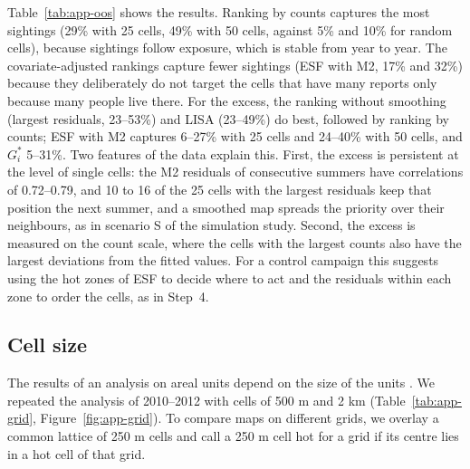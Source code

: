 Table~\ref{tab:app-oos} shows the results. Ranking by counts captures the most sightings (29\% with 25 cells, 49\% with 50 cells, against 5\% and 10\% for random cells), because sightings follow exposure, which is stable from year to year. The covariate-adjusted rankings capture fewer sightings (ESF with M2, 17\% and 32\%) because they deliberately do not target the cells that have many reports only because many people live there. For the excess, the ranking without smoothing (largest residuals, 23--53\%) and LISA (23--49\%) do best, followed by ranking by counts; ESF with M2 captures 6--27\% with 25 cells and 24--40\% with 50 cells, and $G_i^*$ 5--31\%. Two features of the data explain this. First, the excess is persistent at the level of single cells: the M2 residuals of consecutive summers have correlations of 0.72--0.79, and 10 to 16 of the 25 cells with the largest residuals keep that position the next summer, and a smoothed map spreads the priority over their neighbours, as in scenario S of the simulation study. Second, the excess is measured on the count scale, where the cells with the largest counts also have the largest deviations from the fitted values. For a control campaign this suggests using the hot zones of ESF to decide where to act and the residuals within each zone to order the cells, as in Step~4.

\begin{table}[ht]
\centering
\caption{Share of the next summer's sightings and of its excess over the M2 covariates captured by the first 25 and 50 cells of each priority list. Each column is a pair of training and test summers.}\label{tab:app-oos}
\resizebox{\textwidth}{!}{}
\end{table}

\subsection{Cell size}\label{sec:app-grid}



The results of an analysis on areal units depend on the size of the units \citep{openshaw1984modifiable}. We repeated the analysis of 2010--2012 with cells of 500 m and 2 km (Table~\ref{tab:app-grid}, Figure~\ref{fig:app-grid}). To compare maps on different grids, we overlay a common lattice of 250 m cells and call a 250 m cell hot for a grid if its centre lies in a hot cell of that grid.

